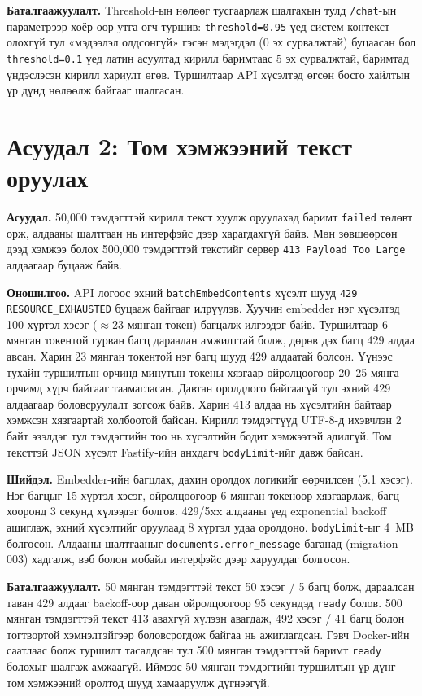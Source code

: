 \documentclass[../main.tex]{subfiles}
\begin{document}
\textbf{Баталгаажуулалт.} Threshold-ын нөлөөг тусгаарлаж шалгахын тулд
\texttt{/chat}-ын параметрээр хоёр өөр утга өгч туршив:
\texttt{threshold=0.95} үед систем контекст олохгүй тул «мэдээлэл
олдсонгүй» гэсэн мэдэгдэл (0 эх сурвалжтай) буцаасан бол
\texttt{threshold=0.1} үед латин асуултад кирилл баримтаас 5 эх сурвалжтай,
баримтад үндэслэсэн кирилл хариулт өгөв. Туршилтаар API хүсэлтэд өгсөн
босго хайлтын үр дүнд нөлөөлж байгааг шалгасан.

\section{Асуудал 2: Том хэмжээний текст оруулах}
\label{sec:problem-large-paste}

\textbf{Асуудал.} 50{,}000 тэмдэгттэй кирилл текст хуулж оруулахад баримт
\texttt{failed} төлөвт орж, алдааны шалтгаан нь интерфэйс дээр харагдахгүй
байв. Мөн зөвшөөрсөн дээд хэмжээ болох 500{,}000 тэмдэгттэй текстийг
сервер \texttt{413 Payload Too Large} алдаагаар буцааж байв.

\textbf{Оношилгоо.} API логоос эхний \texttt{batchEmbedContents} хүсэлт
шууд \texttt{429 RESOURCE\_\allowbreak EXHAUSTED} буцааж байгааг илрүүлэв. Хуучин
embedder нэг хүсэлтэд 100 хүртэл хэсэг ($\approx$23 мянган токен) багцалж
илгээдэг байв. Туршилтаар 6 мянган токентой гурван багц дараалан
амжилттай болж, дөрөв дэх багц 429 алдаа авсан. Харин 23 мянган токентой
нэг багц шууд 429 алдаатай болсон. Үүнээс тухайн туршилтын орчинд минутын
токены хязгаар ойролцоогоор 20--25 мянга орчимд хүрч байгааг таамагласан.
Давтан оролдлого байгаагүй тул эхний 429 алдаагаар боловсруулалт зогсож
байв. Харин 413 алдаа нь хүсэлтийн байтаар хэмжсэн хязгаартай холбоотой
байсан. Кирилл тэмдэгтүүд UTF-8-д ихэвчлэн 2 байт эзэлдэг тул тэмдэгтийн
тоо нь хүсэлтийн бодит хэмжээтэй адилгүй. Том тексттэй JSON хүсэлт
Fastify-ийн анхдагч \texttt{bodyLimit}-ийг давж байсан.

\textbf{Шийдэл.} Embedder-ийн багцлах, дахин оролдох логикийг өөрчилсөн
(5.1 хэсэг). Нэг багцыг 15 хүртэл хэсэг, ойролцоогоор 6 мянган токеноор
хязгаарлаж, багц хооронд 3 секунд хүлээдэг болгов. 429/5xx алдааны үед
exponential backoff ашиглаж, эхний хүсэлтийг оруулаад 8 хүртэл удаа
оролдоно. \texttt{bodyLimit}-ыг 4~MB болгосон. Алдааны шалтгааныг
\texttt{documents.error\_message} баганад (migration 003) хадгалж,
вэб болон мобайл интерфэйс дээр харуулдаг болгосон.

\textbf{Баталгаажуулалт.} 50 мянган тэмдэгттэй текст 50 хэсэг / 5 багц болж,
дараалсан таван 429 алдааг backoff-оор даван ойролцоогоор 95 секундэд
\texttt{ready} болов. 500 мянган тэмдэгттэй текст 413 авахгүй хүлээн
авагдаж, 492 хэсэг / 41 багц болон тогтвортой хэмнэлтэйгээр боловсрогдож
байгаа нь ажиглагдсан. Гэвч Docker-ийн саатлаас болж туршилт тасалдсан тул
500 мянган тэмдэгттэй баримт \texttt{ready} болохыг шалгаж амжаагүй.
Иймээс 50 мянган тэмдэгтийн туршилтын үр дүнг том хэмжээний оролтод
шууд хамааруулж дүгнээгүй.
\end{document}
